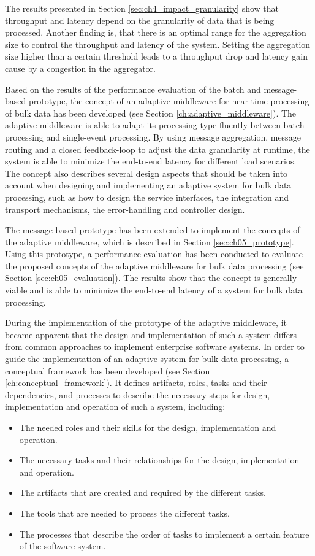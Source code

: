 The results presented in Section \ref{sec:ch4_impact_granularity} show that throughput and latency depend on the granularity of data that is being processed.
Another finding is, that there is an optimal range for the aggregation size to control the throughput and latency of the system. Setting the aggregation size higher than a certain threshold leads to a throughput drop and latency gain cause by a congestion in the aggregator.

Based on the results of the performance evaluation of the batch and message-based prototype, the concept of an adaptive middleware for near-time processing of bulk data has been developed (see Section \ref{ch:adaptive_middleware}). The adaptive middleware is able to adapt its processing type fluently between batch processing and single-event processing. By using message aggregation, message routing and a closed feedback-loop to adjust the data granularity at runtime, the system is able to minimize the end-to-end latency for different load scenarios. The concept also describes several design aspects that should be taken into account when
designing and implementing an adaptive system for bulk data processing, such as how to design the service interfaces, the integration and transport mechanisms, the error-handling and controller design.

The message-based prototype has been extended to implement the concepts of the adaptive middleware, which is described in Section \ref{sec:ch05_prototype}. Using this prototype, a performance evaluation has been conducted to evaluate the proposed concepts of the adaptive middleware for bulk data processing (see Section \ref{sec:ch05_evaluation}). The results show that the concept is generally viable and is able to minimize the end-to-end latency of a system for bulk data processing.

During the implementation of the prototype of the adaptive middleware, it became apparent that the design and implementation of such a system differs from common approaches to implement enterprise software systems. In order to guide the implementation of an adaptive system for bulk data processing, a conceptual framework has been developed (see Section \ref{ch:conceptual_framework}). It defines artifacts, roles, tasks and their dependencies, and processes to describe the necessary steps for design, implementation and operation of such a system, including:
\begin{itemize}
	\item The needed roles and their skills for the design, implementation and operation.
	\item The necessary tasks and their relationships for the design, implementation and operation.
	\item The artifacts that are created and required by the different tasks.
	\item The tools that are needed to process the different tasks.
	\item The processes that describe the order of tasks to implement a certain feature of the software system.
\end{itemize}

